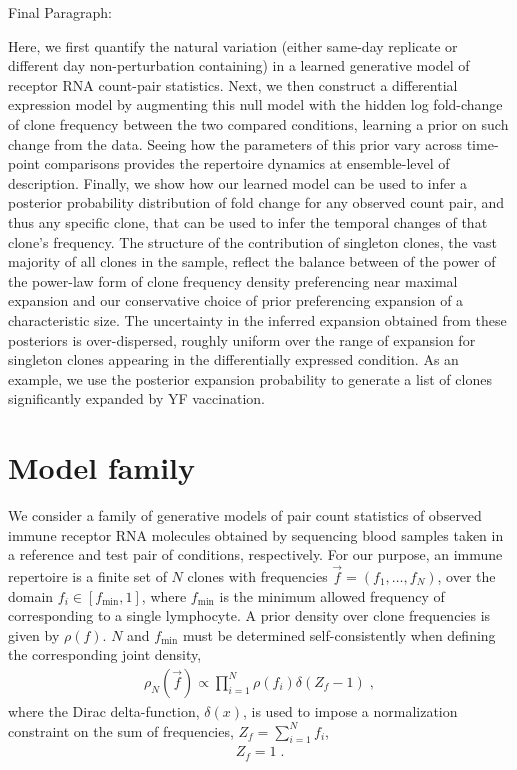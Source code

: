 \documentclass[letterpaper,english,prl,reprint,longbibliography]{revtex4-1} %
\begin{document}
Final Paragraph:

Here, we first quantify the natural variation (either same-day replicate or different day non-perturbation containing) in a learned generative model of receptor RNA count-pair statistics. Next, we then construct a differential expression model by augmenting this null model with the hidden log fold-change of clone frequency between the two compared conditions, learning a prior on such change from the data. Seeing how the parameters of this prior vary across time-point comparisons provides the repertoire dynamics at ensemble-level of description. Finally, we show how our learned model can be used to infer a posterior probability distribution of fold change for any observed count pair, and thus any specific clone, that can be used to infer the temporal changes of that clone's frequency. The structure of the contribution of singleton clones, the vast majority of all clones in the sample, reflect the balance between of the power of the power-law form of clone frequency density preferencing near maximal expansion and our conservative choice of prior preferencing expansion of a characteristic size. The uncertainty in the inferred expansion obtained from these posteriors is over-dispersed, roughly uniform over the range of expansion for singleton clones appearing in the differentially expressed condition.  As an example, we use the posterior expansion probability to generate a list of clones significantly expanded by YF vaccination. 

\section*{Model family}
We consider a family of generative models of pair count statistics of observed immune receptor RNA molecules obtained by sequencing blood samples taken in a reference and test pair of conditions, respectively. 
For our purpose, an immune repertoire is a finite set of $N$ clones with frequencies $\vec{f}=(f_1,\dots,f_N)$, over the domain $f_i\in[f_{\textrm{min}},1]$, where $f_{\textrm{min}}$ is the minimum allowed frequency of corresponding to a single lymphocyte. A prior density over clone frequencies is given by $\rho(f)$. $N$ and $f_{\textrm{min}}$ must be determined self-consistently when defining the corresponding joint density, 
\begin{eqnarray}
	\rho_N(\vec{f})\propto \prod_{i=1}^N\rho(f_i)\delta(Z_f-1)\;,\label{eq:jointf}
\end{eqnarray}
where the Dirac delta-function, $\delta(x)$, is used to impose a normalization constraint on the sum of frequencies, $Z_f=\sum_{i=1}^N f_i$, 
\begin{align}
  Z_f=1\;. \label{eq:norm_constr}
\end{align}
\end{document}

